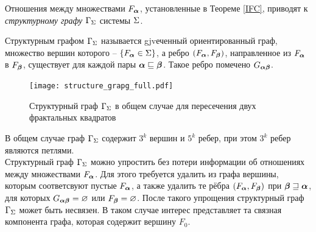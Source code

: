 %
%
%
%
%

Отношения между множествами $F_{\bm{\alpha}}$, установленные в Теореме \ref{IFC}, приводят к {\em структурному графу $\Gamma_\Sigma$} системы $\Sigma$. 

\begin{definition}
Структурным графом $\Gamma_\Sigma$ называется gjvеченный ориентированный граф, множество вершин  которого -- $\{F_{\bm{\alpha}}\in\Sigma\}$, а  ребро $(F_{\bm{\alpha}},F_{\bm{\beta}})$, направленное из $F_{\bm{\alpha}}$ в $F_{\bm{\beta}}$, существует для каждой пары ${\bm{\alpha}}\sqsubseteq{\bm{\beta}}$.  Такое ребро помечено  $G_{{\bm{\alpha}}{\bm{\beta}}}$.
\end{definition}

\begin{figure}[h!]
    \centering
    \texttt{[image: structure\_grapg\_full.pdf]}
    \caption{Структурный граф $\Gamma_\Sigma$ в общем случае для пересечения двух фрактальных квадратов}
\end{figure}

В общем случае граф $\Gamma_\Sigma$   содержит $3^k$ вершин и $5^k$ ребер, при этом $3^k$ ребер являются петлями.\\

Структурный граф $\Gamma_\Sigma$ можно упростить без потери информации об отношениях между множествами $F_{\bm{\alpha}}$.
Для этого требуется удалить из графа вершины, которым соответсвуют пустые $F_{\bm{\alpha}}$, а также удалить те рёбра $(F_{\bm{\alpha}},F_{\bm{\beta}})$ при ${\bm{\beta}}\sqsupseteq{\bm{\alpha}}$, для которых $G_{{\bm{\alpha}}{\bm{\beta}}}=\varnothing$ или $F_{\bm{\beta}}=\varnothing$.
После такого упрощения структурный граф $\Gamma_\Sigma$ может быть несвязен.
В таком случае интерес представляет та связная компонента графа, которая содержит вершину $F_0$.\\

